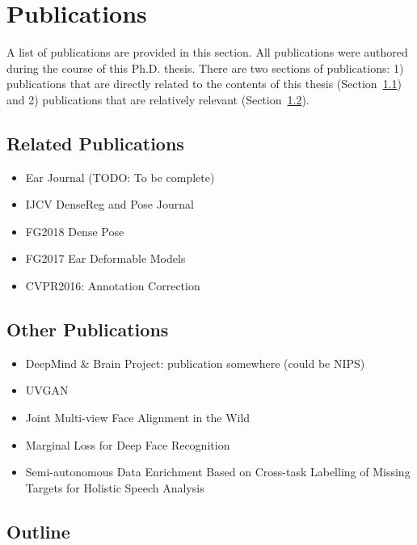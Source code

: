 \section{Publications}
A list of publications are provided in this section. All publications were authored during the course of this Ph.D. thesis. There are two sections of publications: 1) publications that are directly related to the contents of this thesis (Section~\ref{label:related_pubs}) and 2) publications that are relatively relevant (Section~\ref{label:other_pubs}).

\subsection{Related Publications}
\label{label:related_pubs}

\begin{itemize}
  \item Ear Journal (TODO: To be complete)
  \item IJCV DenseReg and Pose Journal
  \item FG2018 Dense Pose
  \item FG2017 Ear Deformable Models
  \item CVPR2016: Annotation Correction
\end{itemize}

\subsection{Other Publications}
\label{label:other_pubs}

\begin{itemize}
  \item DeepMind \& Brain Project: publication somewhere (could be NIPS)
  \item UVGAN
  \item Joint Multi-view Face Alignment in the Wild
  \item Marginal Loss for Deep Face Recognition
  \item Semi-autonomous Data Enrichment Based on Cross-task Labelling of Missing Targets for Holistic Speech Analysis
\end{itemize}

\subsection{Outline}


